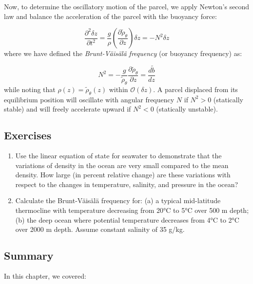 \documentclass[12pt]{article}
\numberwithin{equation}{section}
\numberwithin{figure}{section}
\numberwithin{table}{section}
\begin{document}
Now, to determine the oscillatory motion of the parcel, we apply Newton's second
law and balance the acceleration of the parcel with the buoyancy force:

\begin{equation}
  \frac{\partial^2 \delta z}{\partial t^2} = \frac{g}{\rho} \left( \frac{\partial \widetilde{\rho}_\theta}{\partial z} \right) \delta z =
  - N^2 \delta z
\end{equation}
where we have defined the \textit{Brunt-Väisälä frequency}
(or buoyancy frequency) as:

\begin{equation}
  N^2 = - \frac{g}{\widetilde{\rho}_\theta} \frac{\partial \widetilde{\rho}_\theta}{\partial z} =
  \frac{d\widetilde{b}}{dz}
\end{equation}
while noting that $\rho(z) = \widetilde{\rho}_\theta(z)$ within
$\mathcal{O}(\delta z)$.
A parcel displaced from its equilibrium position will oscillate with angular
frequency $N$ if $N^2 > 0$ (statically stable) and will freely accelerate
upward if $N^2 < 0$ (statically unstable).

\subsection*{Exercises}

\begin{enumerate}

  \item Use the linear equation of state for seawater to demonstrate that the
  variations of density in the ocean are very small compared to the mean
  density. How large (in percent relative change) are these variations with
  respect to the changes in temperature, salinity, and pressure in the ocean?

  \item Calculate the Brunt-Väisälä frequency for:
  (a) a typical mid-latitude thermocline with temperature decreasing from 20°C
  to 5°C over 500 m depth;
  (b) the deep ocean where potential temperature decreases from 4°C to 2°C
  over 2000 m depth.
  Assume constant salinity of 35 g/kg.

\end{enumerate}

\subsection*{Summary}

In this chapter, we covered:
\end{document}
